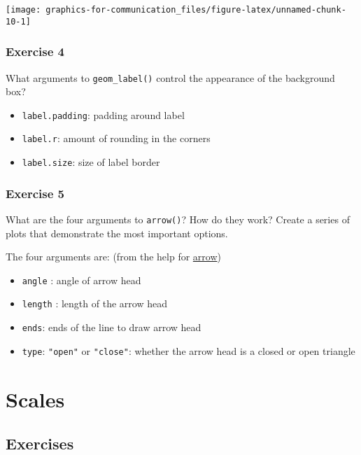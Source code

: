 \documentclass[]{book}
\providecommand{\tightlist}{%
  \setlength{\itemsep}{0pt}\setlength{\parskip}{0pt}}
\theoremstyle{plain}
\theoremstyle{remark}
\theoremstyle{definition}
\theoremstyle{definition}
\theoremstyle{definition}
\theoremstyle{remark}
\begin{document}
\begin{center}\texttt{[image: graphics-for-communication\_files/figure-latex/unnamed-chunk-10-1]} \end{center}

\hypertarget{exercise-4-42}{%
\subsubsection{Exercise 4}\label{exercise-4-42}}

What arguments to \texttt{geom\_label()} control the appearance of the
background box?

\begin{itemize}
\tightlist
\item
  \texttt{label.padding}: padding around label
\item
  \texttt{label.r}: amount of rounding in the corners
\item
  \texttt{label.size}: size of label border
\end{itemize}

\hypertarget{exercise-5-22}{%
\subsubsection{Exercise 5}\label{exercise-5-22}}

What are the four arguments to \texttt{arrow()}? How do they work?
Create a series of plots that demonstrate the most important options.

The four arguments are: (from the help for
\href{https://www.rdocumentation.org/packages/grid/versions/3.3.2/topics/arrow}{arrow})

\begin{itemize}
\tightlist
\item
  \texttt{angle} : angle of arrow head
\item
  \texttt{length} : length of the arrow head
\item
  \texttt{ends}: ends of the line to draw arrow head
\item
  \texttt{type}: \texttt{"open"} or \texttt{"close"}: whether the arrow
  head is a closed or open triangle
\end{itemize}

\hypertarget{scales}{%
\section{Scales}\label{scales}}

\hypertarget{exercises-9}{%
\subsection{Exercises}\label{exercises-9}}
\end{document}
